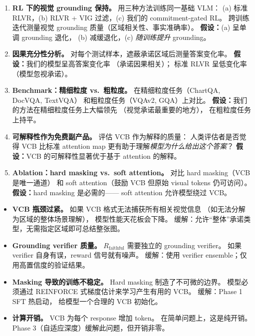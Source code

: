 \documentclass[12pt,a4paper]{article}
\begin{document}
\begin{expbox}
\begin{enumerate}[leftmargin=1.5em]
  \item \textbf{RL 下的视觉 grounding 保持。}
    用三种方法训练同一基础 VLM：
    (a) 标准 RLVR，(b) RLVR + VIG 过滤，(c) 我们的 commitment-gated RL。
    跨训练迭代测量视觉 grounding 质量（区域相关性、事实准确率）。
    \textbf{假设：}(a) 呈单调 grounding 退化，
    (b) 减缓退化，(c) \textit{随训练提升} grounding。

  \item \textbf{因果充分性分析。}
    对每个测试样本，遮蔽承诺区域后测量答案变化率。
    \textbf{假设：}我们的模型呈高答案变化率
    （承诺因果相关）；
    标准 RLVR 呈低变化率（模型忽视承诺）。

  \item \textbf{Benchmark：精细粒度 vs.\ 粗粒度。}
    在精细粒度任务（ChartQA, DocVQA, TextVQA）
    和粗粒度任务（VQAv2, GQA）上对比。
    \textbf{假设：}我们的方法在精细粒度任务上大幅领先
    （视觉承诺最重要的地方），
    在粗粒度任务上持平。

  \item \textbf{可解释性作为免费副产品。}
    评估 VCB 作为解释的质量：
    人类评估者是否觉得 VCB 比标准 attention map
    更有助于理解\textit{模型为什么给出这个答案}？
    \textbf{假设：}VCB 的可解释性显著优于基于 attention 的解释。

  \item \textbf{Ablation：hard masking vs.\ soft attention。}
    对比 hard masking（VCB 是唯一通道）
    和 soft attention（鼓励 VCB 但原始 visual tokens 仍可访问）。
    \textbf{假设：}hard masking 是必需的——
    soft attention 允许模型绕过 VCB。
\end{enumerate}
\end{expbox}

\begin{riskbox}
\begin{itemize}[leftmargin=1.5em]
  \item \textbf{VCB 瓶颈过紧。}
    如果 VCB 格式无法捕获所有相关视觉信息
    （如无法分解为区域的整体场景理解），
    模型性能天花板会下降。
    缓解：允许``整体''承诺类型，无需指定区域即可总结整张图。
  \item \textbf{Grounding verifier 质量。}
    $R_{\text{faithful}}$ 需要独立的 grounding verifier。
    如果 verifier 自身有误，reward 信号就有噪声。
    缓解：使用 verifier ensemble；仅用高置信度的验证结果。
  \item \textbf{Masking 导致的训练不稳定。}
    Hard masking 制造了不可微的边界。
    模型必须通过 REINFORCE 式梯度估计来学习产生有用的 VCB。
    缓解：Phase 1 SFT 热启动，
    给模型一个合理的 VCB 初始化。
  \item \textbf{计算开销。}
    VCB 为每个 response 增加 token。
    在简单问题上，这是纯开销。
    Phase 3（自适应深度）缓解此问题，但开销非零。
\end{itemize}
\end{riskbox}
\end{document}
